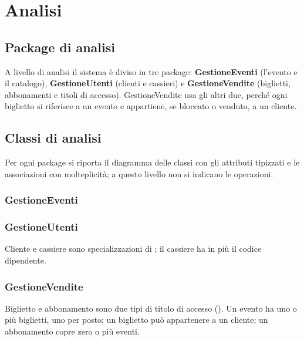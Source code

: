 \section{Analisi}
\label{sec:analisi}

\subsection{Package di analisi}


A livello di analisi il sistema è diviso in tre package: \textbf{GestioneEventi} (l'evento e il catalogo), \textbf{GestioneUtenti} (clienti e cassieri) e \textbf{GestioneVendite} (biglietti, abbonamenti e titoli di accesso). GestioneVendite usa gli altri due, perché ogni biglietto si riferisce a un evento e appartiene, se bloccato o venduto, a un cliente.

\subsection{Classi di analisi}

Per ogni package si riporta il diagramma delle classi con gli attributi tipizzati e le associazioni con molteplicità; a questo livello non si indicano le operazioni.

\subsubsection*{GestioneEventi}

\subsubsection*{GestioneUtenti}
Cliente e cassiere sono specializzazioni di ; il cassiere ha in più il codice dipendente.

\subsubsection*{GestioneVendite}
Biglietto e abbonamento sono due tipi di titolo di accesso (). Un evento ha uno o più biglietti, uno per posto; un biglietto può appartenere a un cliente; un abbonamento copre zero o più eventi.

